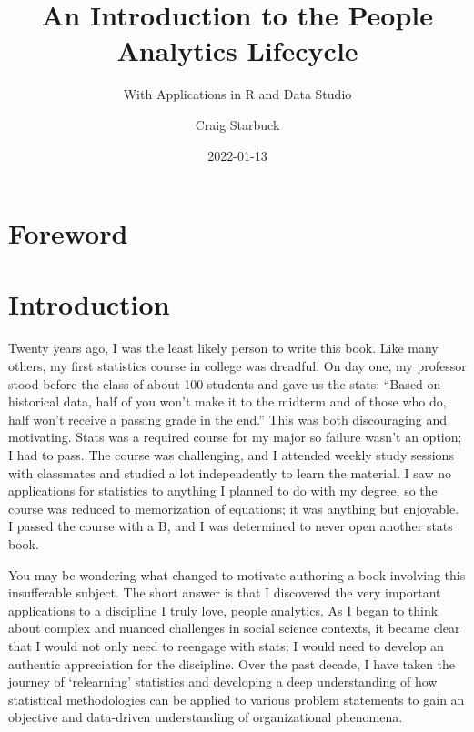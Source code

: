 \documentclass[]{book}
\title{An Introduction to the People Analytics Lifecycle}
\subtitle{With Applications in R and Data Studio}
\author{Craig Starbuck}
\date{2022-01-13}
\begin{document}
\maketitle

{
\setcounter{tocdepth}{1}
\tableofcontents
}
\hypertarget{foreword}{%
\chapter{Foreword}\label{foreword}}

\hypertarget{introduction}{%
\chapter{Introduction}\label{introduction}}

Twenty years ago, I was the least likely person to write this book. Like many others, my first statistics course in college was dreadful. On day one, my professor stood before the class of about 100 students and gave us the stats: ``Based on historical data, half of you won't make it to the midterm and of those who do, half won't receive a passing grade in the end.'' This was both discouraging and motivating. Stats was a required course for my major so failure wasn't an option; I had to pass. The course was challenging, and I attended weekly study sessions with classmates and studied a lot independently to learn the material. I saw no applications for statistics to anything I planned to do with my degree, so the course was reduced to memorization of equations; it was anything but enjoyable. I passed the course with a B, and I was determined to never open another stats book.

You may be wondering what changed to motivate authoring a book involving this insufferable subject. The short answer is that I discovered the very important applications to a discipline I truly love, people analytics. As I began to think about complex and nuanced challenges in social science contexts, it became clear that I would not only need to reengage with stats; I would need to develop an authentic appreciation for the discipline. Over the past decade, I have taken the journey of `relearning' statistics and developing a deep understanding of how statistical methodologies can be applied to various problem statements to gain an objective and data-driven understanding of organizational phenomena.
\end{document}
